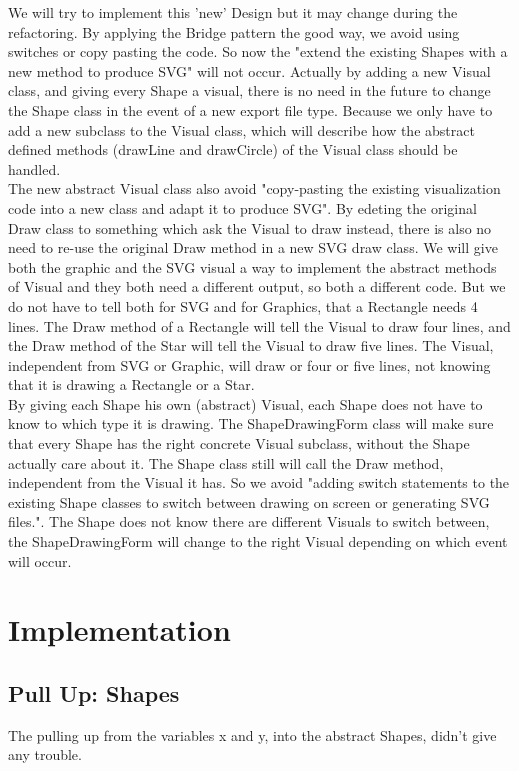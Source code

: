 \documentclass[a4paper,12pt]{article}
\begin{document}

We will try to implement this 'new' Design but it may change during the refactoring. By applying the Bridge pattern the good way, we avoid using switches or copy pasting the code. So now the "extend the existing Shapes with a new method to produce SVG" will not occur. Actually by adding a new Visual class, and giving every Shape a visual, there is no need in the future to change the Shape class in the event of a new export file type. Because we only have to add a new subclass to the Visual class, which will describe how the abstract defined methods (drawLine and drawCircle) of the Visual class should be handled.
\\
The new abstract Visual class also avoid "copy-pasting the existing visualization code into a new class and adapt it to produce SVG". By edeting the original Draw class to something which ask the Visual to draw instead, there is also no need to re-use the original Draw method in a new SVG draw class. We will give both the graphic and the SVG visual a way to implement the abstract methods of Visual and they both need a different output, so both a different code. But we do not have to tell both for SVG and for Graphics, that a Rectangle needs 4 lines. The Draw method of a Rectangle will tell the Visual to draw four lines, and the Draw method of the Star will tell the Visual to draw five lines. The Visual, independent from SVG or Graphic, will draw or four or five lines, not knowing that it is drawing a Rectangle or a Star.
\\
By giving each Shape his own (abstract) Visual, each Shape does not have to know to which type it is drawing. The ShapeDrawingForm class will make sure that every Shape has the right concrete Visual subclass, without the Shape actually care about it. The Shape class still will call the Draw method, independent from the Visual it has. So we avoid "adding switch statements to the existing Shape classes to switch between drawing on screen or generating SVG files.". The Shape does not know there are different Visuals to switch between, the ShapeDrawingForm will change to the right Visual depending on which event will occur.


\section{Implementation}

\subsection{Pull Up: Shapes}
The pulling up from the variables x and y, into the abstract Shapes, didn't give any trouble.
\end{document}
